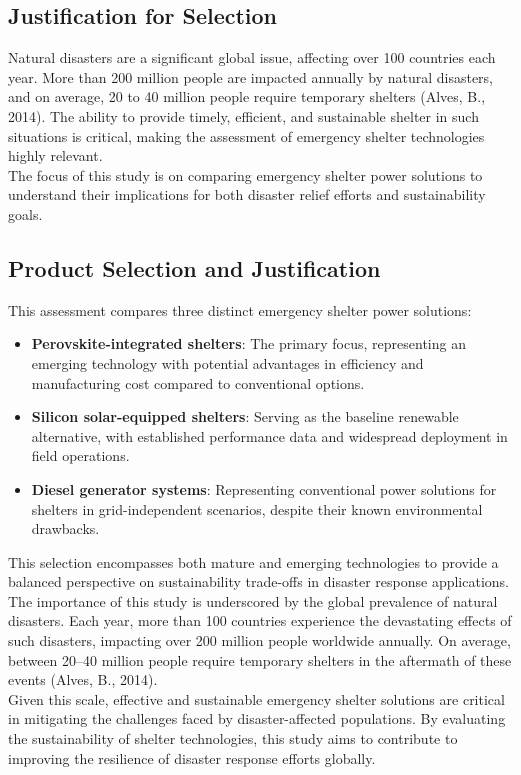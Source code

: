 \documentclass{article}
\begin{document}
\subsection{Justification for Selection}
Natural disasters are a significant global issue, affecting over 100 countries each year. More than 200 million people are impacted annually by natural disasters, and on average, 20 to 40 million people require temporary shelters (Alves, B., 2014). The ability to provide timely, efficient, and sustainable shelter in such situations is critical, making the assessment of emergency shelter technologies highly relevant.\\[8pt]
The focus of this study is on comparing emergency shelter power solutions to understand their implications for both disaster relief efforts and sustainability goals.

\subsection{Product Selection and Justification}
This assessment compares three distinct emergency shelter power solutions:
	\begin{itemize}
		\item \textbf{Perovskite-integrated shelters}: The primary focus, representing an emerging technology with potential advantages in efficiency and manufacturing cost compared to conventional options.
		\item \textbf{Silicon solar-equipped shelters}: Serving as the baseline renewable alternative, with established performance data and widespread deployment in field operations.
		\item \textbf{Diesel generator systems}: Representing conventional power solutions for shelters in grid-independent scenarios, despite their known environmental drawbacks.
	\end{itemize}
This selection encompasses both mature and emerging technologies to provide a balanced perspective on sustainability trade-offs in disaster response applications.\\[8pt]
The importance of this study is underscored by the global prevalence of natural disasters. Each year, more than 100 countries experience the devastating effects of such disasters, impacting over 200 million people worldwide annually. On average, between 20--40 million people require temporary shelters in the aftermath of these events (Alves, B., 2014).\\[8pt] 
Given this scale, effective and sustainable emergency shelter solutions are critical in mitigating the challenges faced by disaster-affected populations. By evaluating the sustainability of shelter technologies, this study aims to contribute to improving the resilience of disaster response efforts globally.
\end{document}
